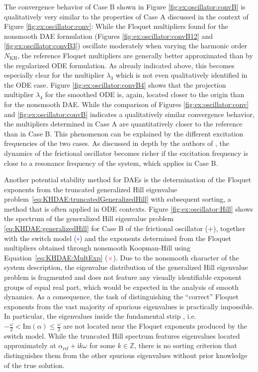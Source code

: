 \documentclass[a4paper, nonatbib, 3p, twocolumn]{elsarticle}
\theoremstyle{plain}
\theoremstyle{definition}
\theoremstyle{remark}
\newcommand{\ic}{\ri} %
\newcommand{\Zspace}{\mathbb{Z}}
\newcommand{\ri}{\mathrm i}
\begin{document}
The convergence behavior of Case B shown in Figure \ref{fig:ex:oscillator:convB} is qualitatively very similar to the properties of Case A discussed in the context of Figure \ref{fig:ex:oscillator:conv}:
While the Floquet multipliers found for the nonsmooth DAE formulation (Figures \ref{fig:ex:oscillator:convB12} and \ref{fig:ex:oscillator:convB3}) oscillate moderately when varying the harmonic order $N_\mathrm{KH}$, the reference Floquet multipliers are generally better approximated than by the regularized ODE formulation.
As already indicated above, this becomes especially clear for the multiplier $\lambda_3$ which is not even qualitatively identified in the ODE case.
Figure \ref{fig:ex:oscillator:convB4} shows that the projection multiplier $\lambda_4$ for the smoothed ODE is, again, located closer to the origin than for the nonsmooth DAE.
While the comparison of Figures \ref{fig:ex:oscillator:conv} and \ref{fig:ex:oscillator:convB} indicates a qualitatively similar convergence behavior, the multipliers determined in Case A are quantitatively closer to the reference than in Case B.
This phenomenon can be explained by the different excitation frequencies
of the two cases.
As discussed in depth by the authors of \cite{Legrand2024}, the dynamics of the frictional oscillator becomes richer if the excitation frequency is close to a resonance frequency of the system, which applies in Case B.

Another potential stability method for DAEs is the determination of the Floquet exponents from the truncated generalized Hill eigenvalue problem~\eqref{eq:KHDAE:truncatedGeneralizedHill} with subsequent sorting, a method that is often applied in ODE contexts.
Figure \ref{fig:ex:oscillator:Hill} shows the spectrum of the generalized Hill eigenvalue problem \eqref{eq:KHDAE:generalizedHill} for Case B of the frictional oscillator ($+$), together with the switch model (\textcolor{blue}{$\circ$}) and the exponents determined from the Floquet multipliers obtained through nonsmooth Koopman-Hill using Equation~\eqref{eq:KHDAE:MultExp} (\textcolor{red}{$\times$}).
Due to the nonsmooth character of the system description, the eigenvalue distribution of the generalized Hill eigenvalue problem is fragmented and does not feature any visually identifiable exponent groups of equal real part, which would be expected in the analysis of smooth dynamics.
As a consequence, the task of distinguishing the ``correct'' Floquet exponents from the vast majority of spurious eigenvalues is practically impossible.
In particular, the eigenvalues inside the fundamental strip , i.e. $- \frac{\omega}{2} < \mathrm{Im}(\alpha) \leq \frac{\omega}{2}$ are not located near the Floquet exponents produced by the switch model.
While the truncated Hill spectrum features eigenvalues located approximately at $\alpha_\mathrm{ref} + \ic k \omega$ for some $k\in\Zspace$, there is no sorting criterion that distinguishes them from the other spurious eigenvalues without prior knowledge of the true solution.
\end{document}
